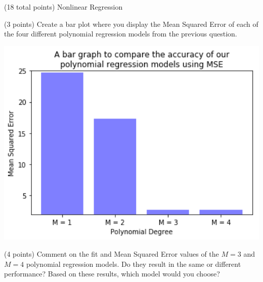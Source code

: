 \documentclass[12pt]{article}
\begin{document}
\begin{question}{(18 total points) Nonlinear Regression}
\begin{subquestion}
\end{subquestion}


%
%
\begin{subquestion}{(3 points) Create a bar plot where you display the Mean Squared Error of each of the four different polynomial regression models from the previous question.}


\begin{answerbox}{35em}
\includegraphics [width=1\textwidth]{images/q2b-graph.png}
\end{answerbox}



\end{subquestion}


%
%
\begin{subquestion}{(4 points) Comment on the fit and Mean Squared Error values of the $M=3$ and $M=4$ polynomial regression models. 
Do they result in the same or different performance? 
Based on these results, which model would you choose?}



\end{subquestion}
\end{question}
\end{document}
